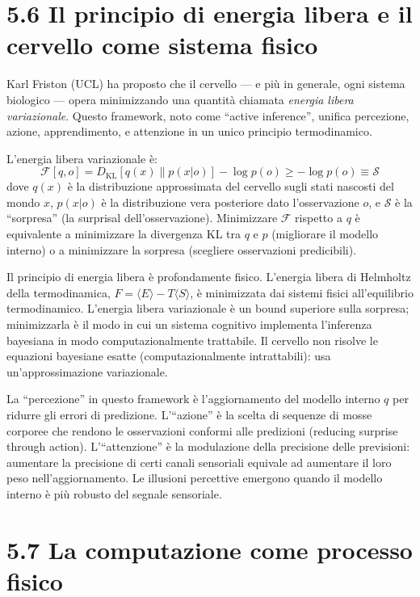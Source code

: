 \documentclass[11.5pt,a4paper,openany]{book}
\theoremstyle{remark}
\begin{document}
\section{5.6 Il principio di energia libera e il cervello come sistema fisico}

Karl Friston (UCL) ha proposto che il cervello --- e più in generale, ogni sistema biologico --- opera minimizzando una quantità chiamata \textit{energia libera variazionale}. Questo framework, noto come ``active inference'', unifica percezione, azione, apprendimento, e attenzione in un unico principio termodinamico.

L'energia libera variazionale è:
\[
\mathcal{F}[q, o] = D_{\text{KL}}[q(x) \| p(x|o)] - \log p(o) \geq -\log p(o) \equiv \mathcal{S}
\]
dove $q(x)$ è la distribuzione approssimata del cervello sugli stati nascosti del mondo $x$, $p(x|o)$ è la distribuzione vera posteriore dato l'osservazione $o$, e $\mathcal{S}$ è la ``sorpresa'' (la surprisal dell'osservazione). Minimizzare $\mathcal{F}$ rispetto a $q$ è equivalente a minimizzare la divergenza KL tra $q$ e $p$ (migliorare il modello interno) o a minimizzare la sorpresa (scegliere osservazioni predicibili).

Il principio di energia libera è profondamente fisico. L'energia libera di Helmholtz della termodinamica, $F = \langle E \rangle - T\langle S \rangle$, è minimizzata dai sistemi fisici all'equilibrio termodinamico. L'energia libera variazionale è un bound superiore sulla sorpresa; minimizzarla è il modo in cui un sistema cognitivo implementa l'inferenza bayesiana in modo computazionalmente trattabile. Il cervello non risolve le equazioni bayesiane esatte (computazionalmente intrattabili): usa un'approssimazione variazionale.

La ``percezione'' in questo framework è l'aggiornamento del modello interno $q$ per ridurre gli errori di predizione. L'``azione'' è la scelta di sequenze di mosse corporee che rendono le osservazioni conformi alle predizioni (reducing surprise through action). L'``attenzione'' è la modulazione della precisione delle previsioni: aumentare la precisione di certi canali sensoriali equivale ad aumentare il loro peso nell'aggiornamento. Le illusioni percettive emergono quando il modello interno è più robusto del segnale sensoriale.

\section{5.7 La computazione come processo fisico}
\end{document}
